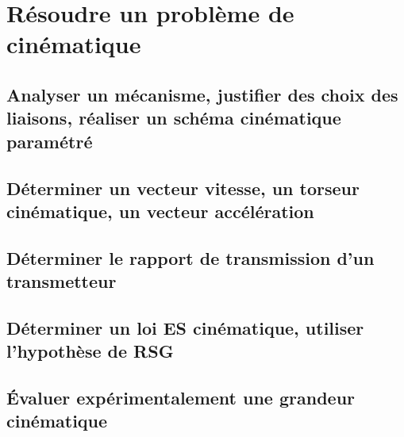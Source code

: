 \setchapterpreamble[u]{\margintoc} 
\chapter{Résoudre un problème de cinématique} 
\section{Analyser un mécanisme, justifier des choix des liaisons, réaliser un schéma cinématique paramétré} 
\section{Déterminer un vecteur vitesse, un torseur cinématique, un vecteur accélération} 
\section{Déterminer le rapport de transmission d'un transmetteur} 
\section{Déterminer un loi ES cinématique, utiliser l'hypothèse de RSG} 
\section{Évaluer expérimentalement une grandeur cinématique} 
